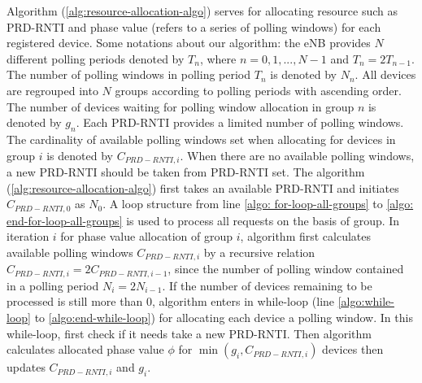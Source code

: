 Algorithm (\ref{alg:resource-allocation-algo}) serves for allocating resource such as PRD-RNTI and phase value 
(refers to a series of polling windows) 
for each registered device.
Some notations about our algorithm: the eNB provides $N$ different polling periods denoted by $T_{n}$, where $n=0,1,...,N-1$ and $T_{n} = 2T_{n-1}$. The number of polling windows in polling period $T_{n}$ is denoted by $N_{n}$. All devices are regrouped into $N$ groups according to polling periods with ascending order. The number of devices waiting for polling window allocation in group $n$ is denoted by $g_{n}$. Each PRD-RNTI provides a limited number of polling windows. The cardinality of available polling windows set when allocating for devices in group $i$ is denoted by $C_{PRD-RNTI, i}$. When there are no available polling windows, a new PRD-RNTI should be taken from PRD-RNTI set. 
The algorithm (\ref{alg:resource-allocation-algo}) first takes an available PRD-RNTI and initiates $C_{PRD-RNTI, 0}$ as $N_{0}$. A loop structure from line \ref{algo: for-loop-all-groups} to \ref{algo: end-for-loop-all-groups} is used to process all requests on the basis of group. In iteration $i$ for phase value allocation of group $i$, algorithm first calculates available polling windows $C_{PRD-RNTI, i}$ by a recursive relation $C_{PRD-RNTI, i}=2C_{PRD-RNTI, i-1}$, since the number of polling window contained in a polling period $N_{i} = 2N_{i-1}$. If the number of devices remaining to be processed is still more than $0$, algorithm enters in while-loop (line \ref{algo:while-loop} to \ref{algo:end-while-loop}) for allocating each device a polling window. In this while-loop, first check if it needs take a new PRD-RNTI. Then algorithm calculates allocated phase value $\phi$ for $\min (g_{i}, C_{PRD-RNTI, i})$ devices then updates $C_{PRD-RNTI, i}$ and $g_{i}$. 
